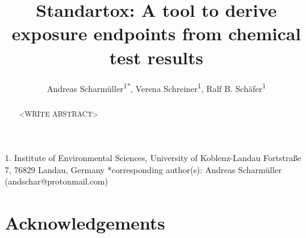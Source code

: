 \documentclass[english]{article}
\begin{document}
\title{Standartox: A tool to derive exposure endpoints from chemical test results}

\author{Andreas Scharm{\"u}ller\textsuperscript{1{*}},
        Verena Schreiner\textsuperscript{1},
        Ralf B. Sch{\"a}fer\textsuperscript{1}}

\maketitle
\thispagestyle{fancy}

1. Institute of Environmental Sciences, University of Koblenz-Landau Fortstraße 7, 76829 Landau, Germany {*}corresponding author(s):
Andreas Scharm{\"u}ller (andschar@protonmail.com)

\begin{abstract}

<WRITE ABSTRACT>

\end{abstract}
\pagebreak


\pagebreak


\pagebreak


\pagebreak


\pagebreak




\section*{Acknowledgements}
\end{document}
